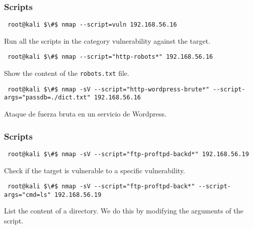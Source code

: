 \documentclass[aspectratio=169,xcolor=dvipsnames]{beamer}
\begin{document}
\begin{frame}[fragile]
    \frametitle{Scripts}

    \begin{lstlisting}
 root@kali $\#$ nmap --script=vuln 192.168.56.16
    \end{lstlisting}

    Run all the scripts in the category vulnerability against the target.

    \pause

    \begin{lstlisting}
 root@kali $\#$ nmap --script="http-robots*" 192.168.56.16
    \end{lstlisting}

    Show the content of the \texttt{robots.txt} file.

    \pause

    \begin{lstlisting}
 root@kali $\#$ nmap -sV --script="http-wordpress-brute*" --script-args="passdb=./dict.txt" 192.168.56.16
    \end{lstlisting}
       
    Ataque de fuerza bruta en un servicio de Wordpress.

\end{frame}

\begin{frame}[fragile]
    \frametitle{Scripts}

    \begin{lstlisting}
 root@kali $\#$ nmap -sV --script="ftp-proftpd-backd*" 192.168.56.19
    \end{lstlisting}

    Check if the target is vulnerable to a specific vulnerability.

    \pause       

    \begin{lstlisting}
 root@kali $\#$ nmap -sV --script="ftp-proftpd-back*" --script-args="cmd=ls" 192.168.56.19
    \end{lstlisting}

    List the content of a directory. We do this by modifying the arguments of the script.

\end{frame}
\end{document}
